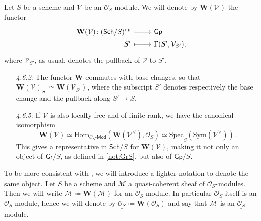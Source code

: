 \begin{defn}\label{defn:fppfSheafAssociatedtoMod}
	Let $S$ be a scheme and $\mathcal{V}$ be an $\mathcal{O}_{ S }$-module.
	We will denote by $\mathbf{W}(\mathcal{V})$ the functor
	\begin{equation*}
	\begin{tikzcd}[row sep = 0ex
		,/tikz/column 1/.append style={anchor=base east}
		,/tikz/column 2/.append style={anchor=base west}]
		\mathbf{W}(\mathcal{V})\colon 
		(\mathsf{Sch}/S)^{op} \arrow[r, "", rightarrow] &
		\mathsf{Gp} \\
		S' \arrow[r, "", mapsto] & 
		\Gamma(S', \mathcal{V}_{S'})
	,\end{tikzcd}
	\end{equation*} 
	where $\mathcal{V}_{S'}$, as usual, denotes the pullback of
	$\mathcal{V}$ to $S'$.
\end{defn}


\begin{rem}\leavevmode\vspace{-1.2\baselineskip}
\begin{enumerate}
\item[{\em 4.6.2}:]
	The functor $\mathbf{W}$ commutes with base changes,
	so that $\mathbf{W}(\mathcal{V})_{S'} \simeq \mathbf{W}(\mathcal{V}_{S'})$,
	where the subscript $S'$ denotes respectively the base change 
	and the pullback along $S' \to S$.

\item[{\em 4.6.5}:]
	If $\mathcal{V}$ is also  locally-free and of finite rank, we have the canonical isomorphism
	\begin{equation*}
		\mathbf{W}(\mathcal{V}) \simeq
		\mathrm{Hom}_{ \mathcal{O}_{ S }\text{-}\mathsf{Mod} }
		\left(\mathbf{W}(\mathcal{V}^\vee) , \mathcal{O}_{ S } \right) \simeq
		\underline{\mathrm{Spec}}_S(\mathrm{Sym}(\mathcal{V}^\vee))
	.\end{equation*}
	This gives a representative in $\mathsf{Sch}/S$ for 
	$\mathbf{W}(\mathcal{V})$, making it not only an object of $\mathsf{Gr}/S$,
	as defined in \cref{not:GrS}, but also of $\mathsf{Gp}/S$.
\end{enumerate}
\end{rem}


\begin{ntt}\label{not:fppfOsModule}
	To be more consistent with \cite{Messing}, we will introduce a 
	lighter notation to denote the same object.
	Let $S$ be a scheme and $\mathcal{M}$ a quasi-coherent sheaf of $\mathcal{O}_{ S }$-modules.
	Then we will write $\underline{\mathcal{M}} \coloneqq \mathbf{W}(\mathcal{M})$ for
	an $\mathcal{O}_{ S }$-module.
	In particular $\mathcal{O}_{ S }$ itself is an $\mathcal{O}_{ S }$-module, hence
	we will denote by $\underline{\mathcal{O}_{ S }} \coloneqq \mathbf{W}(\mathcal{O}_{ S })$
	and say that $\underline{\mathcal{M}}$ is an $\underline{\mathcal{O}_{ S }}$-module.
\end{ntt}


